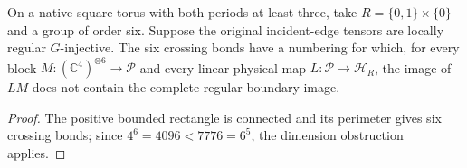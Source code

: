 \begin{lemma}%
    \label{thm:peps_two_site_open_boundary_obstruction}
    \leanok
    On a native square torus with both periods at least three, take
    $R=\{0,1\}\times\{0\}$ and a group of order six. Suppose the original
    incident-edge tensors are locally regular $G$-injective. The six
    crossing bonds have a numbering for which, for every block
    $M:(\mathbb C^4)^{\otimes6}\to\mathcal P$ and every linear physical map
    $L:\mathcal P\to\mathcal H_R$, the image of $LM$ does not contain the
    complete regular boundary image.
\end{lemma}
\begin{proof}\leanok
    The positive bounded rectangle is connected and its perimeter gives
    six crossing bonds; since $4^6=4096<7776=6^5$, the dimension obstruction
    applies.
\end{proof}
